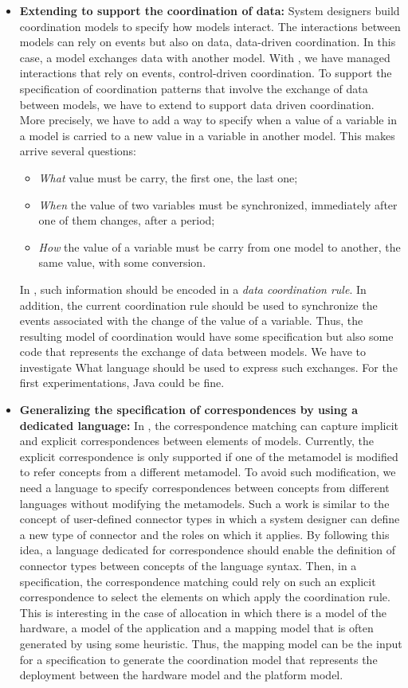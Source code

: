 \begin{itemize}
	\item \textbf{Extending \bcool to support the coordination of data:} System designers build coordination models to specify how models interact. The interactions between models can rely on events but also on data, \ie data-driven coordination. In this case, a model exchanges data with another model. With \bcool, we have managed interactions that rely on events, \ie control-driven coordination. To support the specification of coordination patterns that involve the exchange of data between models, we have to extend \bcool to support data driven coordination. More precisely, we have to add a way to specify when a value of a variable in a model is carried to a new value in a variable in another model. This makes arrive several questions:
			\begin{itemize}
				\item \emph{What} value must be carry, \eg the first one, the last one;
				\item \emph{When} the value of two variables must be synchronized, \eg immediately after one of them changes, after a period;
				\item \emph{How} the value of a variable must be carry from one model to another, \eg the same value, with some conversion. 
			\end{itemize}
	In \bcool, such information should be encoded in a \emph{data coordination rule}. In addition, the current coordination rule should be used to synchronize the events associated with the change of the value of a variable. Thus, the resulting model of coordination would have some \ccsl specification but also some code that represents the exchange of data between models. We have to investigate What language should be used to express such exchanges. For the first experimentations, Java could be fine.    	 
	\item \textbf{Generalizing the specification of correspondences by using a dedicated language:} In \bcool, the correspondence matching can capture implicit and explicit correspondences between elements of models. Currently, the explicit correspondence is only supported if one of the metamodel is modified to refer concepts from a different metamodel. To avoid such modification, we need a language to specify correspondences between concepts from different languages without modifying the metamodels. Such a work is similar to the concept of user-defined connector types in which a system designer can define a new type of connector and the roles on which it applies. By following this idea, a language dedicated for correspondence should enable the definition of connector types between concepts of the language syntax. Then, in a \bcool specification, the correspondence matching could rely on such an explicit correspondence to select the elements on which apply the coordination rule. This is interesting in the case of allocation in which there is a model of the hardware, a model of the application and a mapping model that is often generated by using some heuristic. Thus, the mapping model can be the input for a \bcool specification to generate the coordination model that represents the deployment between the hardware model and the platform model.

\end{itemize}
